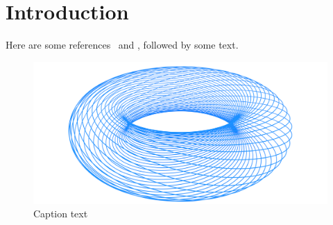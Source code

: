 \chapter{Introduction}

Here are some references~\cite{Highcock2012, Abel2013, VanWyk2016} and
, followed by some text.

\begin{figure}[t]
  \centering
  \includegraphics[width=0.7\linewidth]{figures/torus.png}
  \caption[Figure title]{Caption text}
  \label{fig:torus}
\end{figure}

\lipsum[1-3]
